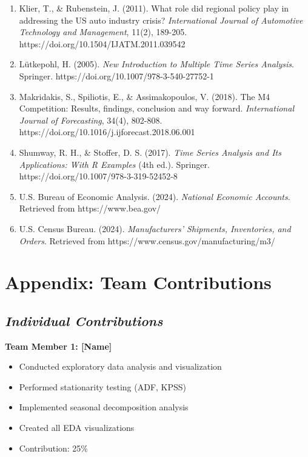 \documentclass[12pt]{article}
\begin{document}
\begin{enumerate}
    \item Klier, T., \& Rubenstein, J. (2011). What role did regional policy play in addressing the US auto industry crisis? \textit{International Journal of Automotive Technology and Management}, 11(2), 189-205. https://doi.org/10.1504/IJATM.2011.039542

    \item Lütkepohl, H. (2005). \textit{New Introduction to Multiple Time Series Analysis}. Springer. https://doi.org/10.1007/978-3-540-27752-1

    \item Makridakis, S., Spiliotis, E., \& Assimakopoulos, V. (2018). The M4 Competition: Results, findings, conclusion and way forward. \textit{International Journal of Forecasting}, 34(4), 802-808. https://doi.org/10.1016/j.ijforecast.2018.06.001

    \item Shumway, R. H., \& Stoffer, D. S. (2017). \textit{Time Series Analysis and Its Applications: With R Examples} (4th ed.). Springer. https://doi.org/10.1007/978-3-319-52452-8

    \item U.S. Bureau of Economic Analysis. (2024). \textit{National Economic Accounts}. Retrieved from https://www.bea.gov/

    \item U.S. Census Bureau. (2024). \textit{Manufacturers' Shipments, Inventories, and Orders}. Retrieved from https://www.census.gov/manufacturing/m3/
\end{enumerate}

\newpage
\appendix

\section*{\textbf{Appendix: Team Contributions}}

\subsection*{\textit{Individual Contributions}}

\textbf{Team Member 1: [Name]}
\begin{itemize}
    \item Conducted exploratory data analysis and visualization
    \item Performed stationarity testing (ADF, KPSS)
    \item Implemented seasonal decomposition analysis
    \item Created all EDA visualizations
    \item Contribution: 25\%
\end{itemize}
\end{document}
